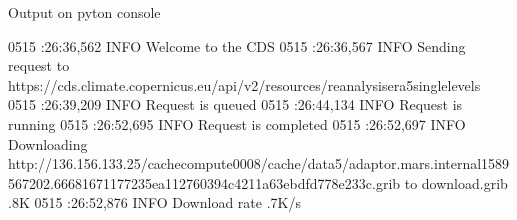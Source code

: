 \documentclass[letterpaper,10pt,english]{sphinxmanual}
\begin{document}
\begin{sphinxShadowBox}
\begin{sphinxVerbatim}[commandchars=\\\{\}]
              
              
              
              
              
              
      \PYG{p}{]}
       \PYG{p}{[}
              
      \PYG{p}{]}
\end{sphinxVerbatim}

Output on pyton console

\begin{sphinxVerbatim}[commandchars=\\\{\}]
\PYGZhy{}05\PYGZhy{}15 :26:36,562 INFO Welcome to the CDS
\PYGZhy{}05\PYGZhy{}15 :26:36,567 INFO Sending request to https://cds.climate.copernicus.eu/api/v2/resources/reanalysis\PYGZhy{}era5\PYGZhy{}single\PYGZhy{}levels
\PYGZhy{}05\PYGZhy{}15 :26:39,209 INFO Request is queued
\PYGZhy{}05\PYGZhy{}15 :26:44,134 INFO Request is running
\PYGZhy{}05\PYGZhy{}15 :26:52,695 INFO Request is completed
\PYGZhy{}05\PYGZhy{}15 :26:52,697 INFO Downloading http://136.156.133.25/cache\PYGZhy{}compute\PYGZhy{}0008/cache/data5/adaptor.mars.internal\PYGZhy{}1589567202.6668167\PYGZhy{}11772\PYGZhy{}35\PYGZhy{}ea112760\PYGZhy{}394c\PYGZhy{}4211\PYGZhy{}a63e\PYGZhy{}bdfd778e233c.grib to download.grib .8K
\PYGZhy{}05\PYGZhy{}15 :26:52,876 INFO Download rate .7K/s
\end{sphinxVerbatim}
\end{sphinxShadowBox}
\end{document}
